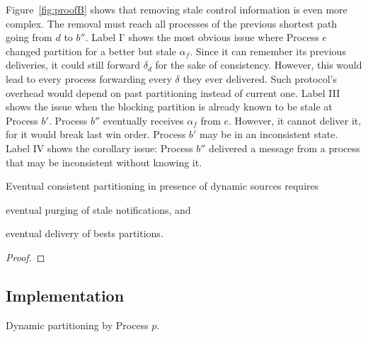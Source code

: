 \noindent Figure~\ref{fig:proofB} shows that removing stale control
information is even more complex. The removal must reach all processes
of the previous shortest path going from $d$ to $b''$. Label I' shows
the most obvious issue where Process $e$ changed partition for a
better but stale $\alpha_f$. Since it can remember its previous
deliveries, it could still forward $\delta_d$ for the sake of
consistency. However, this would lead to every process forwarding
every $\delta$ they ever delivered. Such protocol's overhead would
depend on past partitioning instead of current one. Label III shows
the issue when the blocking partition is already known to be stale at
Process $b'$. Process $b''$ eventually receives $\alpha_f$ from
$e$. However, it cannot deliver it, for it would break last win order.
Process $b'$ may be in an inconsistent state. Label IV shows the
corollary issue: Process $b''$ delivered a message from a process that
may be inconsistent without knowing it.

\begin{corollary}
  Eventual consistent partitioning in presence of dynamic sources
  requires
  \begin{inparaenum}[(i)]
  \item eventual purging of stale notifications, and
  \item eventual delivery of bests partitions.
  \end{inparaenum}
\end{corollary}

\begin{proof}
\end{proof}



\subsection{Implementation}

\begin{algorithm}
  
  \caption{\label{algo:adddelundo}Dynamic partitioning by Process $p$.}
\end{algorithm}

